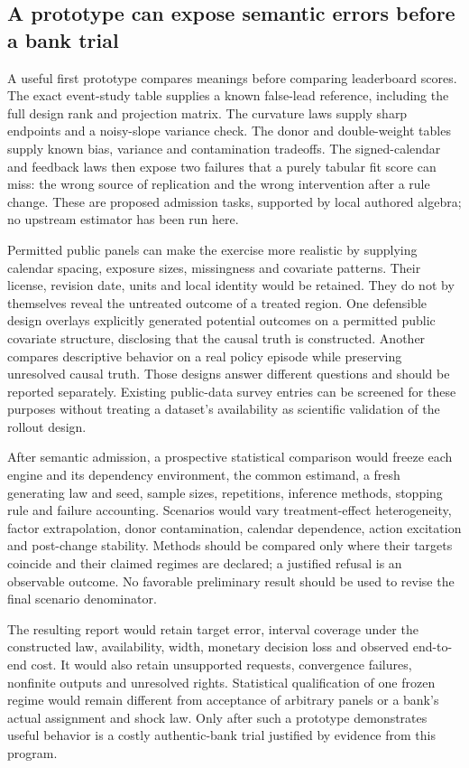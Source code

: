 \subsection{A prototype can expose semantic errors before a bank trial}
\label{exec17:s6-prototype}

A useful first prototype compares meanings before comparing leaderboard
scores. The exact event-study table supplies a known false-lead
reference, including the full design rank and projection matrix.
The curvature laws supply sharp endpoints and a noisy-slope variance
check. The donor and double-weight tables supply known bias, variance
and contamination tradeoffs. The signed-calendar and feedback laws
then expose two failures that a purely tabular fit score can miss:
the wrong source of replication and the wrong intervention after
a rule change. These are proposed admission tasks, supported by
local authored algebra; no upstream estimator has been run here.
\citep{exec17_s6_math,exec17_s6_design}

Permitted public panels can make the exercise more realistic by supplying
calendar spacing, exposure sizes, missingness and covariate patterns.
Their license, revision date, units and local identity would be retained.
They do not by themselves reveal the untreated outcome of a treated
region. One defensible design overlays explicitly generated potential
outcomes on a permitted public covariate structure, disclosing that
the causal truth is constructed. Another compares descriptive behavior
on a real policy episode while preserving unresolved causal truth.
Those designs answer different questions and should be reported
separately. Existing public-data survey entries can be screened for
these purposes without treating a dataset's availability as scientific
validation of the rollout design.

After semantic admission, a prospective statistical comparison would
freeze each engine and its dependency environment, the common
estimand, a fresh generating law and seed, sample sizes, repetitions,
inference methods, stopping rule and failure accounting. Scenarios
would vary treatment-effect heterogeneity, factor extrapolation,
donor contamination, calendar dependence, action excitation and
post-change stability. Methods should be compared only where their
targets coincide and their claimed regimes are declared; a justified
refusal is an observable outcome. No favorable preliminary result
should be used to revise the final scenario denominator.

The resulting report would retain target error, interval coverage
under the constructed law, availability, width, monetary decision
loss and observed end-to-end cost. It would also retain unsupported
requests, convergence failures, nonfinite outputs and unresolved
rights. Statistical qualification of one frozen regime would remain
different from acceptance of arbitrary panels or a bank's actual
assignment and shock law. Only after such a prototype demonstrates
useful behavior is a costly authentic-bank trial justified by evidence
from this program.\citep{exec17_s6_design}

